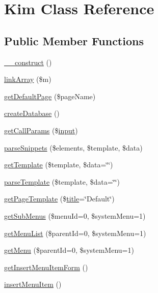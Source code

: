 \hypertarget{classKim}{}\section{Kim Class Reference}
\label{classKim}
\subsection*{Public Member Functions}
\begin{DoxyCompactItemize}
\item 
\hyperlink{classKim_a23fe2ba2b5a76fe09200e2f0fbded794}{\+\_\+\+\_\+construct} ()
\item 
\hyperlink{classKim_a98cd6f87644136345cd5203952f4ddbb}{link\+Array} (\$m)
\item 
\hyperlink{classKim_a8a754c69958e71d159e6808f83f12cfe}{get\+Default\+Page} (\$page\+Name)
\item 
\hyperlink{classKim_ae9db930151f99235866c68fd96208cd8}{create\+Database} ()
\item 
\hyperlink{classKim_adbe9f842961805e68a08df04c4c58dfd}{get\+Call\+Params} (\$\hyperlink{Shape_8php_a6210da308e7ce036a6362dca3018d6db}{input})
\item 
\hyperlink{classKim_a960a80702fe7dd134adbfeea34ccfcfa}{parse\+Snippets} (\$elements, \$template, \$data)
\item 
\hyperlink{classKim_ae484524c4622734ede53894ae89a669a}{get\+Template} (\$template, \$data=\char`\"{}\char`\"{})
\item 
\hyperlink{classKim_a635cc5c4509bd3ac1c578ccfe62c623b}{parse\+Template} (\$template, \$data=\char`\"{}\char`\"{})
\item 
\hyperlink{classKim_a3cb9fd00227b180b8118257b85acf6ff}{get\+Page\+Template} (\$\hyperlink{Shape_8php_ad264ad0cabbe965bf7f7c8a5ed6abebb}{title}=\char`\"{}Default\char`\"{})
\item 
\hyperlink{classKim_a76d369e52b95a9cabdb45c793d3eee45}{get\+Sub\+Menus} (\$menu\+Id=0, \$system\+Menu=1)
\item 
\hyperlink{classKim_ad7f2c106626bd9e83f1a4f76303a6e45}{get\+Menu\+List} (\$parent\+Id=0, \$system\+Menu=1)
\item 
\hyperlink{classKim_ac4c6f020c4abed55574cc4515b8c1b01}{get\+Menu} (\$parent\+Id=0, \$system\+Menu=1)
\item 
\hyperlink{classKim_a7391f7a7d90adef0a048f2679aaa27fd}{get\+Insert\+Menu\+Item\+Form} ()
\item 
\hyperlink{classKim_a03aa4a733e4539d175df84011ad1cb9a}{insert\+Menu\+Item} ()

\end{DoxyCompactItemize}
